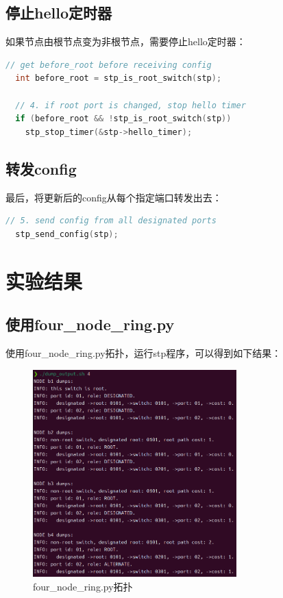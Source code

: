 \documentclass[UTF8]{report}
\begin{document}
\subsection{停止hello定时器}

如果节点由根节点变为非根节点，需要停止hello定时器：

\begin{lstlisting}[language=C]
  // get before_root before receiving config
  int before_root = stp_is_root_switch(stp);

  // 4. if root port is changed, stop hello timer
  if (before_root && !stp_is_root_switch(stp))
    stp_stop_timer(&stp->hello_timer);
\end{lstlisting}

\subsection{转发config}

最后，将更新后的config从每个指定端口转发出去：

\begin{lstlisting}[language=C]
  // 5. send config from all designated ports
  stp_send_config(stp);
\end{lstlisting}

\section{实验结果}

\subsection{使用four\_node\_ring.py}

使用four\_node\_ring.py拓扑，运行stp程序，可以得到如下结果：

\begin{figure}[H]
  \centering
  \includegraphics[width=0.7\textwidth]{four_node_ring.png}
  \caption{four\_node\_ring.py拓扑}
\end{figure}
\end{document}
